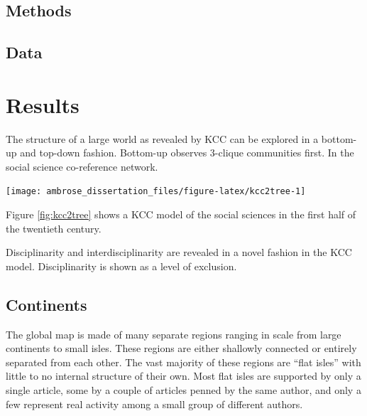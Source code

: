 \documentclass[]{book}
\theoremstyle{definition}
\theoremstyle{definition}
\theoremstyle{definition}
\theoremstyle{remark}
\begin{document}
\hypertarget{methods}{%
\subsection{Methods}\label{methods}}

\hypertarget{data-1}{%
\subsection{Data}\label{data-1}}

\hypertarget{results-1}{%
\section{Results}\label{results-1}}

The structure of a large world as revealed by KCC can be explored in a
bottom-up and top-down fashion. Bottom-up observes 3-clique communities
first. In the social science co-reference network.

\begin{center}\texttt{[image: ambrose\_dissertation\_files/figure-latex/kcc2tree-1]} \end{center}

Figure \ref{fig:kcc2tree} shows a KCC model of the social sciences in
the first half of the twentieth century.

Disciplinarity and interdisciplinarity are revealed in a novel fashion
in the KCC model. Disciplinarity is shown as a level of exclusion.

\hypertarget{continents}{%
\subsection{Continents}\label{continents}}

The global map is made of many separate regions ranging in scale from
large continents to small isles. These regions are either shallowly
connected or entirely separated from each other. The vast majority of
these regions are ``flat isles'' with little to no internal structure of
their own. Most flat isles are supported by only a single article, some
by a couple of articles penned by the same author, and only a few
represent real activity among a small group of different authors.
\end{document}
